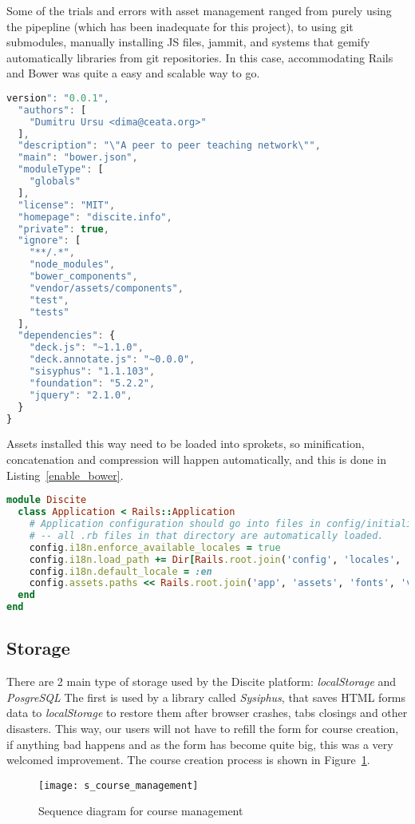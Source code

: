 Some of the trials and errors with asset management ranged from purely using the
pipepline (which has been inadequate for this project), to using git submodules,
manually installing JS files, jammit, and systems that gemify automatically
libraries from git repositories.
In this case, accommodating Rails and Bower was quite a easy and scalable way to go.
\begin{lstlisting}[language=JavaScript, caption={Bower.json file}, label=bower]
version": "0.0.1",
  "authors": [
    "Dumitru Ursu <dima@ceata.org>"
  ],
  "description": "\"A peer to peer teaching network\"",
  "main": "bower.json",
  "moduleType": [
    "globals"
  ],
  "license": "MIT",
  "homepage": "discite.info",
  "private": true,
  "ignore": [
    "**/.*",
    "node_modules",
    "bower_components",
    "vendor/assets/components",
    "test",
    "tests"
  ],
  "dependencies": {
    "deck.js": "~1.1.0",
    "deck.annotate.js": "~0.0.0",
    "sisyphus": "1.1.103",
    "foundation": "5.2.2",
    "jquery": "2.1.0",
  }
}
\end{lstlisting}

Assets installed this way need to be loaded into sprokets, so minification, concatenation and compression
will happen automatically, and this is done in Listing~\ref{enable_bower}.
\begin{lstlisting}[language=Ruby, caption={Plugging Bower into the assets pipeline}, label=enable_bower]
module Discite
  class Application < Rails::Application
    # Application configuration should go into files in config/initializers
    # -- all .rb files in that directory are automatically loaded.
    config.i18n.enforce_available_locales = true
    config.i18n.load_path += Dir[Rails.root.join('config', 'locales', '*.{rb,yml}').to_s]
    config.i18n.default_locale = :en
    config.assets.paths << Rails.root.join('app', 'assets', 'fonts', 'vendor', 'components')
  end
end
\end{lstlisting}

\subsection{Storage}
There are 2 main type of storage used by the Discite platform: \textit{localStorage} and  \textit{PosgreSQL}
The first is used by a library called \textit{Sysiphus}, that saves HTML forms data to
\textit{localStorage} to restore them after browser crashes, tabs closings and other
disasters. This way, our users will not have to refill the form for course creation,
if anything bad happens and as the form has become quite big, this was a very welcomed improvement.
The course creation process is shown in Figure~\ref{fig:course_management}.
\begin{figure}[ht!]
    \centering
    \texttt{[image: s\_course\_management]}
    \caption{Sequence diagram for course management}
    \label{fig:course_management}
\end{figure}

